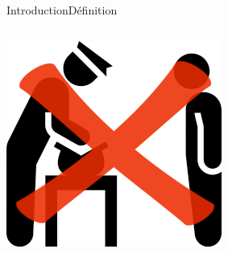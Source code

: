 \documentclass[xcolor=dvipsnames]{beamer}
\begin{document}
\begin{frame}{Introduction}{Définition}
\begin{columns}
    	\begin{column}{0.48\textwidth}
    		\begin{center}
				\includegraphics[scale=0.25]{control.png} 
			\end{center}
    	\end{column}
	\end{columns}

\end{frame}
\end{document}
